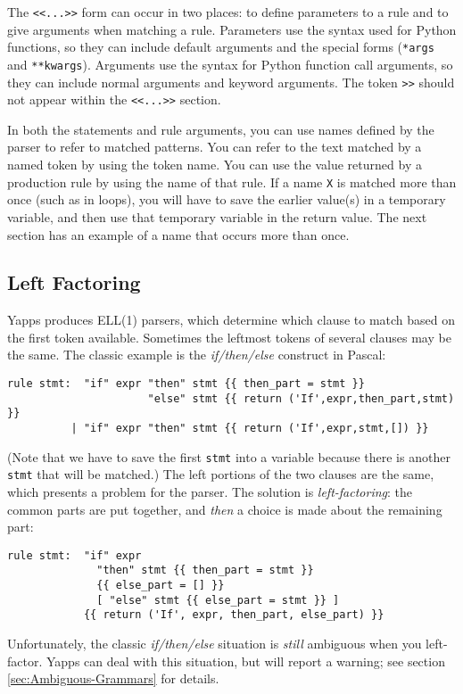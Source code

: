 \documentclass[10pt]{article}
\newcommand{\mysubsection}[1]{\subsection{\textcolor{darkerblue}{#1}}}
\begin{document}
The \verb|<<...>>| form can occur in two places: to define parameters
to a rule and to give arguments when matching a rule.  Parameters use
the syntax used for Python functions, so they can include default
arguments and the special forms (\verb|*args| and \verb|**kwargs|).
Arguments use the syntax for Python function call arguments, so they
can include normal arguments and keyword arguments.  The token
\verb|>>| should not appear within the \verb|<<...>>| section.

In both the statements and rule arguments, you can use names defined
by the parser to refer to matched patterns.  You can refer to the text
matched by a named token by using the token name.  You can use the
value returned by a production rule by using the name of that rule.
If a name \texttt{X} is matched more than once (such as in loops), you
will have to save the earlier value(s) in a temporary variable, and
then use that temporary variable in the return value.  The next
section has an example of a name that occurs more than once.

\mysubsection{Left Factoring}
\label{sec:Left-Factoring}

Yapps produces ELL(1) parsers, which determine which clause to match
based on the first token available.  Sometimes the leftmost tokens of
several clauses may be the same.  The classic example is the
\emph{if/then/else} construct in Pascal:

\begin{verbatim}
rule stmt:  "if" expr "then" stmt {{ then_part = stmt }} 
                      "else" stmt {{ return ('If',expr,then_part,stmt) }}
          | "if" expr "then" stmt {{ return ('If',expr,stmt,[]) }}
\end{verbatim}

(Note that we have to save the first \texttt{stmt} into a variable
because there is another \texttt{stmt} that will be matched.)  The
left portions of the two clauses are the same, which presents a
problem for the parser.  The solution is \emph{left-factoring}: the
common parts are put together, and \emph{then} a choice is made about
the remaining part:

\begin{verbatim}
rule stmt:  "if" expr 
              "then" stmt {{ then_part = stmt }}
              {{ else_part = [] }}
              [ "else" stmt {{ else_part = stmt }} ]
            {{ return ('If', expr, then_part, else_part) }}
\end{verbatim}

Unfortunately, the classic \emph{if/then/else} situation is
\emph{still} ambiguous when you left-factor.  Yapps can deal with this
situation, but will report a warning; see section
\ref{sec:Ambiguous-Grammars} for details.
\end{document}
